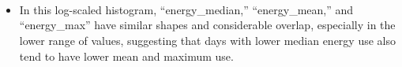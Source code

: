 \documentclass[11pt]{article}
\providecommand{\tightlist}{%
      \setlength{\itemsep}{0pt}\setlength{\parskip}{0pt}}
\begin{document}
    \begin{center}
    \end{center}
    { \hspace*{\fill} \\}
    
    \begin{center}
    \end{center}
    { \hspace*{\fill} \\}
    
    \begin{center}
    \end{center}
    { \hspace*{\fill} \\}
    
    \begin{itemize}
\tightlist
\item
  In this log-scaled histogram, ``energy\_median,'' ``energy\_mean,''
  and ``energy\_max'' have similar shapes and considerable overlap,
  especially in the lower range of values, suggesting that days with
  lower median energy use also tend to have lower mean and maximum use.
\end{itemize}
\end{document}
